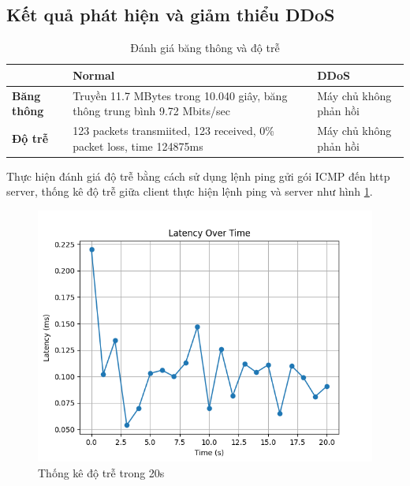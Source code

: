 \documentclass[a4paper]{article}
\begin{document}
\subsection{Kết quả phát hiện và giảm thiểu DDoS}
\begin{table}[H]
    \centering
    \caption{Đánh giá băng thông và độ trễ}
    \label{tab:danhgiabw}
    \addvspace{0.3cm}
    \begin{tabular}{|p{3cm}|p{5cm}|p{5cm}|}
    \hline
         & \textbf{Normal} & \textbf{DDoS} \\ \hline
    \textbf{Băng thông} & Truyền 11.7 MBytes trong 10.040 giây, băng thông trung bình 9.72 Mbits/sec & Máy chủ không phản hồi   \\ \hline
    \textbf{Độ trễ} & 123 packets transmiited, 123 received, 0\% packet loss, time 124875ms & Máy chủ không phản hồi  \\ \hline
    \end{tabular}
\end{table}
Thực hiện đánh giá độ trễ bằng cách sử dụng lệnh ping gửi gói ICMP đến http server, thống kê độ trễ giữa client thực hiện lệnh ping và server như hình \ref{fig:latency_plot}. 
\begin{figure}
    \centering
    \includegraphics[width=1\linewidth]{images//result/latency_plot.png}
    \caption{Thống kê độ trễ trong 20s}
    \label{fig:latency_plot}
\end{figure}
\end{document}
